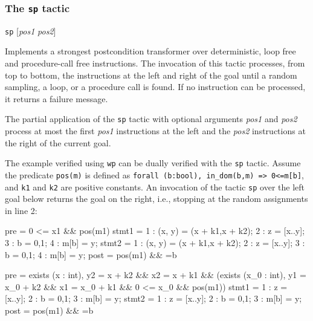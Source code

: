 \subsubsection{The \texttt{sp} tactic}\label{tac:sp} \DONE
\Syntax \verb+sp+ [\textit{pos1} \textit{pos2}]

\Description
Implements a strongest postcondition transformer over deterministic,
loop free and procedure-call free instructions. The invocation of this
tactic processes, from top to bottom, the instructions at the left and
right of the goal until a random sampling, a loop, or a procedure call
is found. If no instruction can be processed, it returns a failure
message.

The partial application of the \verb+sp+ tactic with optional
arguments \textit{pos1} and \textit{pos2} process at most the first
\textit{pos1} instructions at the left and the \textit{pos2}
instructions at the right of the current goal.

\Example The example verified using \verb+wp+ can be dually verified
with the \verb+sp+ tactic. 
Assume the predicate \verb+pos(m)+ is defined as
\verb+forall (b:bool), in_dom(b,m) => 0<=m[b]+, and \verb+k1+ and
\verb+k2+ are positive constants. An invocation of the tactic
\verb+sp+ over the left goal below returns the goal on the right,
i.e., stopping at the random assignments in line 2:

\begin{minicode}{0.5}

pre   = 0 <= x{1} && pos(m{1})
stmt1 =   1 : (x, y) = (x + k1,x + k2);
          2 : z = [x..y];
          3 : b = {0,1};
          4 : m[b] = y;
stmt2 =   1 : (x, y) = (x + k1,x + k2);
          2 : z = [x..y];
          3 : b = {0,1};
          4 : m[b] = y;
post  = pos(m{1}) && ={b}
\end{minicode}
\begin{minicode}{0.5}

pre   = exists (x : int),
          y{2} = x + k2 &&
           x{2} = x + k1 &&
            (exists (x_0 : int),
               y{1} = x_0 + k2 && 
               x{1} = x_0 + k1 && 
               0 <= x_0 && pos(m{1}))
stmt1 =   1 : z = [x..y];
          2 : b = {0,1};
          3 : m[b] = y;
stmt2 =   1 : z = [x..y];
          2 : b = {0,1};
          3 : m[b] = y;
post  = pos(m{1}) && ={b}

\end{minicode}

